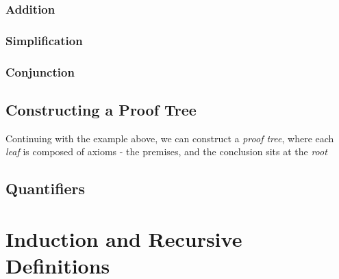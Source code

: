 \documentclass[english,course]{Notes}
\newcommand{\ita}[1]{\textit{#1}}
\begin{document}
\subsubsection{Addition}

\begin{minipage}{.5\textwidth}
\end{minipage}

\subsubsection{Simplification}

\begin{minipage}{.5\textwidth}
\end{minipage}

\subsubsection{Conjunction}

\begin{minipage}{.5\textwidth}
\end{minipage}


\subsection{Constructing a Proof Tree}

\par{Continuing with the example above, we can construct a \ita{proof tree}, where each \ita{leaf} is composed of axioms - the premises, and the conclusion sits at the \ita{root}}


\subsection{Quantifiers}



\newpage

\section{Induction and Recursive Definitions}


\end{document}
